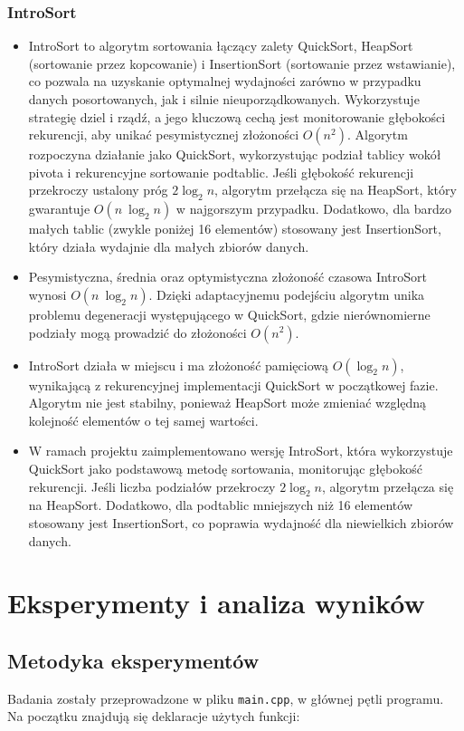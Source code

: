\documentclass[polish,a4paper]{article}
\begin{document}
\subsubsection{IntroSort}
\begin{itemize}
	\item{IntroSort to algorytm sortowania łączący zalety QuickSort, HeapSort (sortowanie przez kopcowanie) i InsertionSort (sortowanie przez wstawianie), co pozwala na uzyskanie optymalnej wydajności zarówno w przypadku danych posortowanych, jak i silnie nieuporządkowanych. Wykorzystuje strategię dziel i rządź, a jego kluczową cechą jest monitorowanie głębokości rekurencji, aby unikać pesymistycznej złożoności $O(n^2)$. Algorytm rozpoczyna działanie jako QuickSort, wykorzystując podział tablicy wokół pivota i rekurencyjne sortowanie podtablic. Jeśli głębokość rekurencji przekroczy ustalony próg $2 \log_2 n$, algorytm przełącza się na HeapSort, który gwarantuje $O(n \ \log_2 n)$ w najgorszym przypadku. Dodatkowo, dla bardzo małych tablic (zwykle poniżej 16 elementów) stosowany jest InsertionSort, który działa wydajnie dla małych zbiorów danych.}
	\item{Pesymistyczna, średnia oraz optymistyczna złożoność czasowa IntroSort wynosi $O(n \ \log_2 n)$. Dzięki adaptacyjnemu podejściu algorytm unika problemu degeneracji występującego w QuickSort, gdzie nierównomierne podziały mogą prowadzić do złożoności $O(n^2)$.}
	\item{IntroSort działa w miejscu i ma złożoność pamięciową $O(\log_2 n)$, wynikającą z rekurencyjnej implementacji QuickSort w początkowej fazie. Algorytm nie jest stabilny, ponieważ HeapSort może zmieniać względną kolejność elementów o tej samej wartości.}
	\item{W ramach projektu zaimplementowano wersję IntroSort, która wykorzystuje QuickSort jako podstawową metodę sortowania, monitorując głębokość rekurencji. Jeśli liczba podziałów przekroczy $2 \log_2 n$, algorytm przełącza się na HeapSort. Dodatkowo, dla podtablic mniejszych niż 16 elementów stosowany jest InsertionSort, co poprawia wydajność dla niewielkich zbiorów danych.}
\end{itemize}

\newpage
\section{Eksperymenty i analiza wyników}
\subsection{Metodyka eksperymentów}
Badania zostały przeprowadzone w pliku \texttt{main.cpp}, w głównej pętli programu. Na początku znajdują się deklaracje użytych funkcji:
\end{document}
